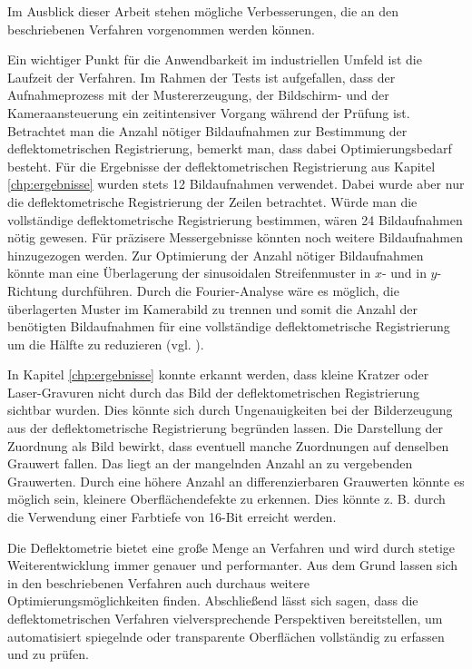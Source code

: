 Im Ausblick dieser Arbeit stehen mögliche Verbesserungen, die an den beschriebenen Verfahren vorgenommen werden können.

\p
Ein wichtiger Punkt für die Anwendbarkeit im industriellen Umfeld ist die Laufzeit der Verfahren.
Im Rahmen der Tests ist aufgefallen, dass der Aufnahmeprozess mit der Mustererzeugung, der Bildschirm- und der Kameraansteuerung ein zeitintensiver Vorgang während der Prüfung ist.
Betrachtet man die Anzahl nötiger Bildaufnahmen zur Bestimmung der deflektometrischen Registrierung, bemerkt man, dass dabei Optimierungsbedarf besteht.
Für die Ergebnisse der deflektometrischen Registrierung aus Kapitel \ref{chp:ergebnisse} wurden stets 12 Bildaufnahmen verwendet.
Dabei wurde aber nur die deflektometrische Registrierung der Zeilen betrachtet.
Würde man die vollständige deflektometrische Registrierung bestimmen, wären 24 Bildaufnahmen nötig gewesen.
Für präzisere Messergebnisse könnten noch weitere Bildaufnahmen hinzugezogen werden.
Zur Optimierung der Anzahl nötiger Bildaufnahmen könnte man eine Überlagerung der sinusoidalen Streifenmuster in $x$- und in $y$-Richtung durchführen.
Durch die Fourier-Analyse wäre es möglich, die überlagerten Muster im Kamerabild zu trennen und somit die Anzahl der benötigten Bildaufnahmen für eine vollständige deflektometrische Registrierung um die Hälfte zu reduzieren (vgl. \cite{singleShotPMD}).

\p
In Kapitel \ref{chp:ergebnisse} konnte erkannt werden, dass kleine Kratzer oder Laser-Gravuren nicht durch das Bild der deflektometrischen Registrierung sichtbar wurden.
Dies könnte sich durch Ungenauigkeiten bei der Bilderzeugung aus der deflektometrische Registrierung begründen lassen.
Die Darstellung der Zuordnung als Bild bewirkt, dass eventuell manche Zuordnungen auf denselben Grauwert fallen.
Das liegt an der mangelnden Anzahl an zu vergebenden Grauwerten.
Durch eine höhere Anzahl an differenzierbaren Grauwerten könnte es möglich sein, kleinere Oberflächendefekte zu erkennen.
Dies könnte z. B. durch die Verwendung einer Farbtiefe von 16-Bit erreicht werden.

\p
Die Deflektometrie bietet eine große Menge an Verfahren und wird durch stetige Weiterentwicklung immer genauer und performanter.
Aus dem Grund lassen sich in den beschriebenen Verfahren auch durchaus weitere Optimierungsmöglichkeiten finden.
Abschließend lässt sich sagen, dass die deflektometrischen Verfahren vielversprechende Perspektiven bereitstellen, um automatisiert spiegelnde oder transparente Oberflächen vollständig zu erfassen und zu prüfen.